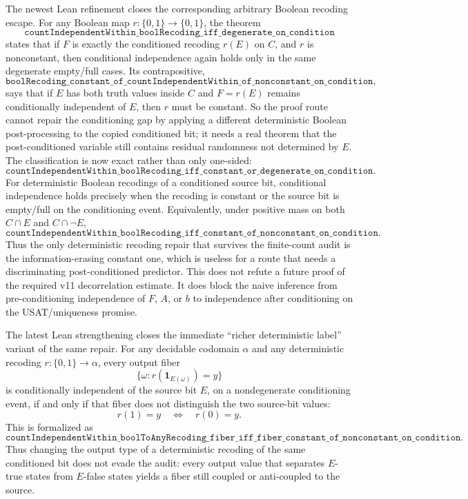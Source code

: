 \documentclass[11pt]{article}
\theoremstyle{remark}
\begin{document}
The newest Lean refinement closes the corresponding arbitrary Boolean recoding escape.  For any
Boolean map \(r:\{0,1\}\to\{0,1\}\), the theorem
\[
  \texttt{countIndependentWithin\_boolRecoding\_iff\_degenerate\_on\_condition}
\]
states that if \(F\) is exactly the conditioned recoding \(r(E)\) on \(C\), and \(r\) is
nonconstant, then conditional independence again holds only in the same degenerate empty/full
cases.  Its contrapositive,
\[
  \texttt{boolRecoding\_constant\_of\_countIndependentWithin\_of\_nonconstant\_on\_condition},
\]
says that if \(E\) has both truth values inside \(C\) and \(F=r(E)\) remains conditionally
independent of \(E\), then \(r\) must be constant.  So the proof route cannot repair the
conditioning gap by applying a different deterministic Boolean post-processing to the copied
conditioned bit; it needs a real theorem that the post-conditioned variable still contains
residual randomness not determined by \(E\).
The classification is now exact rather than only one-sided:
\[
  \texttt{countIndependentWithin\_boolRecoding\_iff\_constant\_or\_degenerate\_on\_condition}.
\]
For deterministic Boolean recodings of a conditioned source bit, conditional independence holds
precisely when the recoding is constant or the source bit is empty/full on the conditioning event.
Equivalently, under positive mass on both \(C\cap E\) and \(C\cap\neg E\),
\[
  \texttt{countIndependentWithin\_boolRecoding\_iff\_constant\_of\_nonconstant\_on\_condition}.
\]
Thus the only deterministic recoding repair that survives the finite-count audit is the
information-erasing constant one, which is useless for a route that needs a discriminating
post-conditioned predictor.
This does not refute a future proof of the required v11 decorrelation estimate.  It does block the
naive inference from pre-conditioning independence of \(F\), \(A\), or \(b\) to independence after
conditioning on the USAT/uniqueness promise.

The latest Lean strengthening closes the immediate ``richer deterministic label''
variant of the same repair.  For any decidable codomain \(\alpha\) and any deterministic
recoding \(r:\{0,1\}\to\alpha\), every output fiber
\[
  \{\omega : r(\mathbf{1}_{E(\omega)}) = y\}
\]
is conditionally independent of the source bit \(E\), on a nondegenerate
conditioning event, if and only if that fiber does not distinguish the two
source-bit values:
\[
  r(1)=y \quad\Longleftrightarrow\quad r(0)=y.
\]
This is formalized as
\[
  \texttt{countIndependentWithin\_boolToAnyRecoding\_fiber\_iff\_fiber\_constant\_of\_nonconstant\_on\_condition}.
\]
Thus changing the output type of a deterministic recoding of the same conditioned bit
does not evade the audit: every output value that separates \(E\)-true states from
\(E\)-false states yields a fiber still coupled or anti-coupled to the source.
\end{document}
